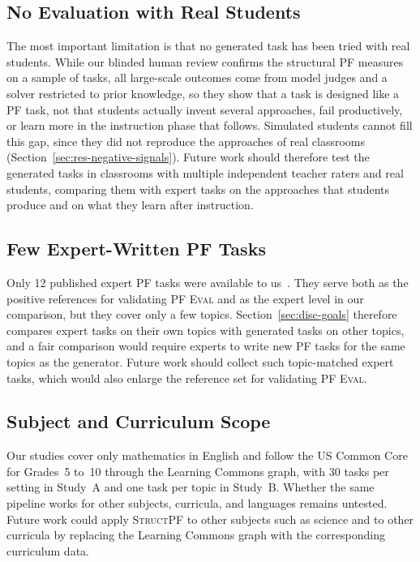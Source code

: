\subsection{No Evaluation with Real Students}
The most important limitation is that no generated task has been tried with real students. While our blinded human review confirms the structural PF measures on a sample of tasks, all large-scale outcomes come from model judges and a solver restricted to prior knowledge, so they show that a task is designed like a PF task, not that students actually invent several approaches, fail productively, or learn more in the instruction phase that follows. Simulated students cannot fill this gap, since they did not reproduce the approaches of real classrooms (Section~\ref{sec:res-negative-signals}). Future work should therefore test the generated tasks in classrooms with multiple independent teacher raters and real students, comparing them with expert tasks on the approaches that students produce and on what they learn after instruction.

\subsection{Few Expert-Written PF Tasks}
Only 12 published expert PF tasks were available to us~\cite{puech2025}. They serve both as the positive references for validating \textsc{PF Eval} and as the expert level in our comparison, but they cover only a few topics. Section~\ref{sec:disc-goals} therefore compares expert tasks on their own topics with generated tasks on other topics, and a fair comparison would require experts to write new PF tasks for the same topics as the generator. Future work should collect such topic-matched expert tasks, which would also enlarge the reference set for validating \textsc{PF Eval}.

\subsection{Subject and Curriculum Scope}
Our studies cover only mathematics in English and follow the US Common Core for Grades~5 to~10 through the Learning Commons graph, with 30 tasks per setting in Study~A and one task per topic in Study~B. Whether the same pipeline works for other subjects, curricula, and languages remains untested. Future work could apply \textsc{StructPF} to other subjects such as science and to other curricula by replacing the Learning Commons graph with the corresponding curriculum data.

